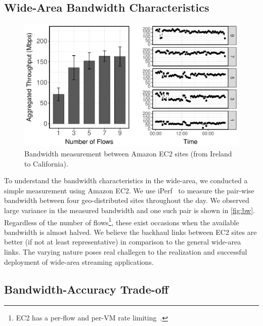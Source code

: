 \subsection{Wide-Area Bandwidth Characteristics}
\label{sec:making-case-adapt}

\begin{figure}
  \centering
  \includegraphics[width=.95\linewidth]{figures/europe-to-us-west.pdf}
  \caption{Bandwidth measurement between Amazon EC2 sites (from Ireland to
    California).}
  \label{fig:bw}
\end{figure}

To understand the bandwidth characteristics in the wide-area, we conducted a
simple measurement using Amazon EC2. We use iPerf~\cite{iperf} to measure the
pair-wise bandwidth between four geo-distributed sites throughout the day. We
observed large variance in the measured bandwidth and one such pair is shown in
\autoref{fig:bw}. Regardless of the number of flows\footnote{EC2 has a per-flow
  and per-VM rate limiting~\cite{zhang2016guaranteeing}.}, these exist occasions
when the available bandwidth is almost halved. We believe the backhaul links
between EC2 sites are better (if not at least representative) in comparison to
the general wide-area links. The varying nature poses real challegen to the
realization and successful deployment of wide-area streaming applications.

\subsection{Bandwidth-Accuracy Trade-off}
\label{sec:bat}


